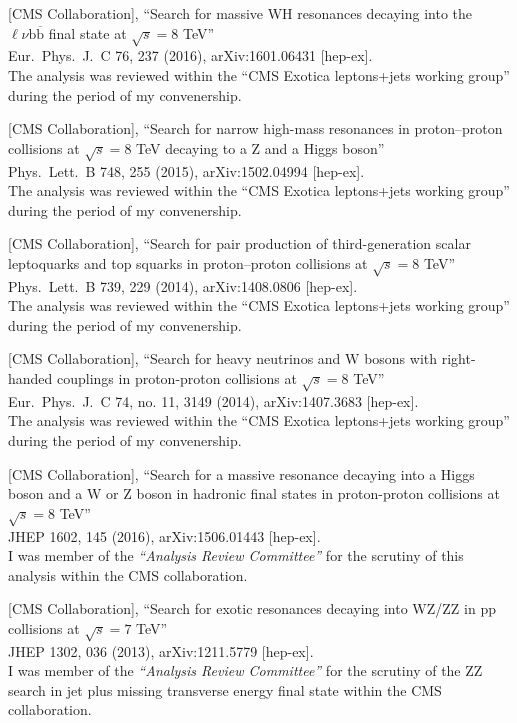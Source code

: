 \documentclass[10pt, a4paper]{article}
\begin{document}
\begin{thebibliography}{599}
[CMS Collaboration],
 ``Search for massive WH resonances decaying into the $\ell \nu \mathrm{b} \overline{\mathrm{b}} $ final state at $\sqrt{s}=8$ TeV''\\
  Eur.\ Phys.\ J.\ C 76, 237 (2016), arXiv:1601.06431 [hep-ex].\\
The analysis was reviewed within the ``CMS Exotica leptons+jets working group'' during
the period of my convenership.

 [CMS Collaboration],
 ``Search for narrow high-mass resonances in proton–proton collisions at $\sqrt{s}=8$ TeV decaying to a Z and a Higgs boson''\\
  Phys.\ Lett.\ B 748, 255 (2015), arXiv:1502.04994 [hep-ex].\\
The analysis was reviewed within the ``CMS Exotica leptons+jets working group'' during
the period of my convenership.

  [CMS Collaboration],
 ``Search for pair production of third-generation scalar leptoquarks
  and top squarks in proton–proton collisions at $\sqrt{s}=8$ TeV''\\
  Phys.\ Lett.\ B 739, 229 (2014), arXiv:1408.0806 [hep-ex].\\
The analysis was reviewed within the ``CMS Exotica leptons+jets working group'' during
the period of my convenership.

  [CMS Collaboration],
 ``Search for heavy neutrinos and $\mathrm {W}$ bosons with
  right-handed couplings in proton-proton collisions at $\sqrt{s}=8$ TeV''\\
  Eur.\ Phys.\ J.\ C 74, no. 11, 3149 (2014), arXiv:1407.3683
  [hep-ex].\\
The analysis was reviewed within the ``CMS Exotica leptons+jets working group'' during
the period of my convenership.

[CMS Collaboration],
``Search for a massive resonance decaying into a Higgs boson and a W or Z boson in hadronic final states in proton-proton collisions at $ \sqrt{s}=8 $ TeV''\\
  JHEP 1602, 145 (2016), arXiv:1506.01443 [hep-ex].
  \\ I was member of the {\it``Analysis Review Committee''} for the scrutiny of this analysis within the CMS collaboration. 

[CMS Collaboration],
 ``Search for exotic resonances decaying into WZ/ZZ in pp collisions at $\sqrt{s}=7$ TeV''\\
 JHEP 1302, 036 (2013), arXiv:1211.5779 [hep-ex].
  \\ I was member of the {\it``Analysis Review Committee''} for the scrutiny of the ZZ search in jet plus missing transverse energy final state within the CMS collaboration. 


\end{thebibliography}
\end{document}
